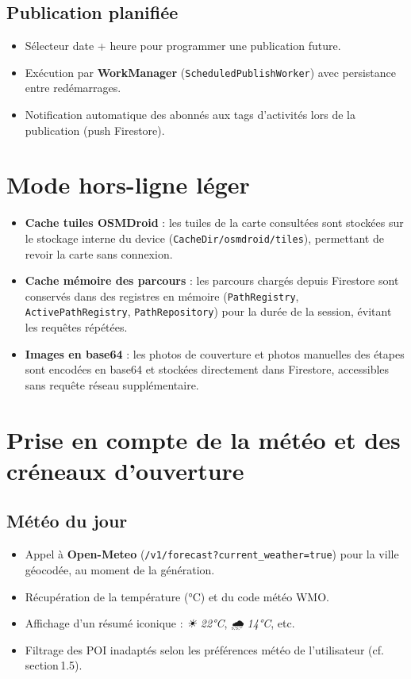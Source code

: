 \documentclass[a4paper,11pt]{article}
\begin{document}
\subsection{Publication planifiée}
\begin{itemize}[leftmargin=1.5em]
  \item Sélecteur date + heure pour programmer une publication future.
  \item Exécution par \textbf{WorkManager} (\texttt{ScheduledPublishWorker})
        avec persistance entre redémarrages.
  \item Notification automatique des abonnés aux tags d'activités lors
        de la publication (push Firestore).
\end{itemize}

\section{Mode hors-ligne léger}

\begin{itemize}[leftmargin=1.5em]
  \item \textbf{Cache tuiles OSMDroid} : les tuiles de la carte consultées
        sont stockées sur le stockage interne du device
        (\texttt{CacheDir/osmdroid/tiles}), permettant de revoir la carte
        sans connexion.
  \item \textbf{Cache mémoire des parcours} : les parcours chargés depuis
        Firestore sont conservés dans des registres en mémoire
        (\texttt{PathRegistry}, \texttt{ActivePathRegistry}, \texttt{PathRepository})
        pour la durée de la session, évitant les requêtes répétées.
  \item \textbf{Images en base64} : les photos de couverture et photos manuelles
        des étapes sont encodées en base64 et stockées directement dans
        Firestore, accessibles sans requête réseau supplémentaire.
\end{itemize}

\section{Prise en compte de la météo et des créneaux d'ouverture}

\subsection{Météo du jour}
\begin{itemize}[leftmargin=1.5em]
  \item Appel à \textbf{Open-Meteo} (\texttt{/v1/forecast?current\_weather=true})
        pour la ville géocodée, au moment de la génération.
  \item Récupération de la température (°C) et du code météo WMO.
  \item Affichage d'un résumé iconique : \textit{☀ 22°C}, \textit{🌧 14°C}, etc.
  \item Filtrage des POI inadaptés selon les préférences météo de l'utilisateur
        (cf. section\,1.5).
\end{itemize}
\end{document}
